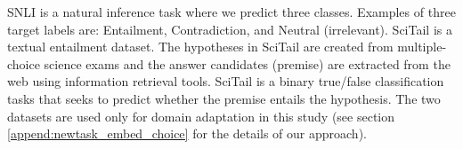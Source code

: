 \documentclass{article} \usepackage{iclr2021_conference,times}
\begin{document}
SNLI is a natural inference task where we predict three classes. Examples of three target labels are: Entailment, Contradiction, and Neutral (irrelevant). SciTail is a textual entailment dataset. The hypotheses in SciTail are created from multiple-choice science exams and the answer candidates (premise) are extracted from the web using information retrieval tools. SciTail is a binary true/false classification tasks that seeks to predict whether the premise entails the hypothesis. The two datasets are used only for domain adaptation in this study (see section \ref{append:newtask_embed_choice} for the details of our approach).
\clearpage
\end{document}
